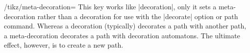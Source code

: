 \begin{key}{/tikz/meta-decoration=}
  This key works like |decoration|, only it sets a meta-decoration
  rather than a decoration for use with the |decorate| option or path
  command. Whereas a decoration (typically) decorates a path
  with another path, a meta-decoration decorates a path with
  decoration automatons. The ultimate effect, however, is to create a
  new path. 

\begin{codeexample}[]
\end{codeexample}
\end{key}



